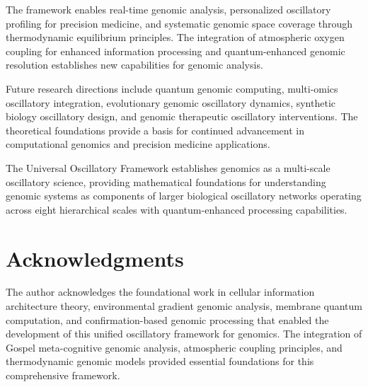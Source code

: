 \documentclass[12pt,a4paper]{article}
\begin{document}
The framework enables real-time genomic analysis, personalized oscillatory profiling for precision medicine, and systematic genomic space coverage through thermodynamic equilibrium principles. The integration of atmospheric oxygen coupling for enhanced information processing and quantum-enhanced genomic resolution establishes new capabilities for genomic analysis.

Future research directions include quantum genomic computing, multi-omics oscillatory integration, evolutionary genomic oscillatory dynamics, synthetic biology oscillatory design, and genomic therapeutic oscillatory interventions. The theoretical foundations provide a basis for continued advancement in computational genomics and precision medicine applications.

The Universal Oscillatory Framework establishes genomics as a multi-scale oscillatory science, providing mathematical foundations for understanding genomic systems as components of larger biological oscillatory networks operating across eight hierarchical scales with quantum-enhanced processing capabilities.

\section{Acknowledgments}

The author acknowledges the foundational work in cellular information architecture theory, environmental gradient genomic analysis, membrane quantum computation, and confirmation-based genomic processing that enabled the development of this unified oscillatory framework for genomics. The integration of Gospel meta-cognitive genomic analysis, atmospheric coupling principles, and thermodynamic genomic models provided essential foundations for this comprehensive framework.
\end{document}
